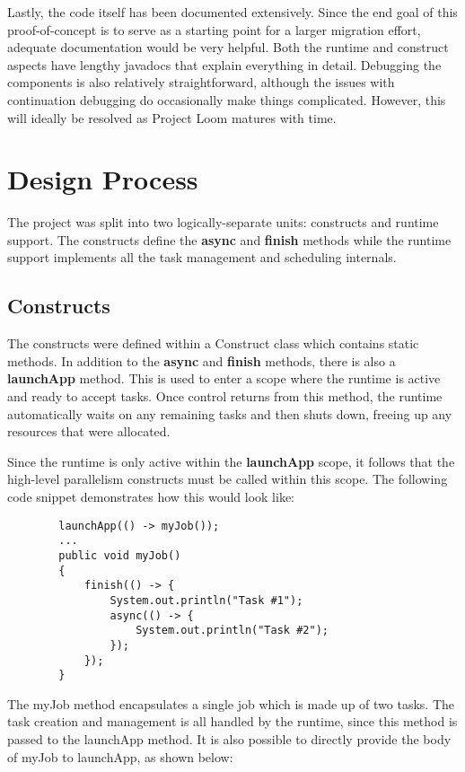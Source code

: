 \documentclass[12pt]{article}
\begin{document}
    Lastly, the code itself has been documented extensively. Since the end goal of this proof-of-concept is
    to serve as a starting point for a larger migration effort, adequate documentation would be very helpful.
    Both the runtime and construct aspects have lengthy javadocs that explain everything in detail. Debugging
    the components is also relatively straightforward, although the issues with continuation debugging do
    occasionally make things complicated. However, this will ideally be resolved as Project Loom matures with
    time.

    \section{Design Process}

    The project was split into two logically-separate units: constructs and runtime support. The constructs
    define the \textbf{async} and \textbf{finish} methods while the runtime support implements all the task
    management and scheduling internals.

    \subsection{Constructs}

    The constructs were defined within a Construct class which contains static methods. In addition to the
    \textbf{async} and \textbf{finish} methods, there is also a \textbf{launchApp} method. This is used to
    enter a scope where the runtime is active and ready to accept tasks. Once control returns from this
    method, the runtime automatically waits on any remaining tasks and then shuts down, freeing up any
    resources that were allocated.

    Since the runtime is only active within the \textbf{launchApp} scope, it follows that the high-level
    parallelism constructs must be called within this scope. The following code snippet demonstrates how this
    would look like:

    \begin{lstlisting}
        launchApp(() -> myJob());
        ...
        public void myJob()
        {
            finish(() -> {
                System.out.println("Task #1");
                async(() -> {
                    System.out.println("Task #2");
                });
            });
        }
    \end{lstlisting}

    The myJob method encapsulates a single job which is made up of two tasks. The task creation and
    management is all handled by the runtime, since this method is passed to the launchApp method. It is also
    possible to directly provide the body of myJob to launchApp, as shown below:
\end{document}
